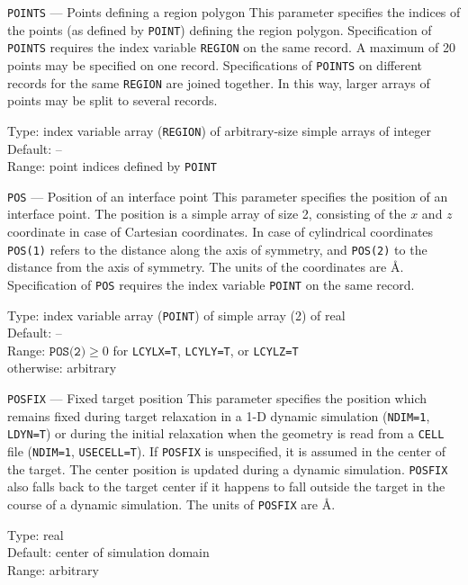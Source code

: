 \begin{keydescription}{\texttt{POINTS} --- Points defining a region polygon}
%
  This parameter specifies the indices of the points (as defined by
  \texttt{POINT}) defining the region polygon.  Specification of
  \texttt{POINTS} requires the index variable \texttt{REGION} on the same
  record. A maximum of 20 points may be specified on one record.
  Specifications of \texttt{POINTS} on different records for the same
  \texttt{REGION} are joined together.  In this way, larger arrays of points 
  may be split to several records.  
  \begin{keytab}
    Type:    \> index variable array (\texttt{REGION}) of arbitrary-size 
    simple arrays of integer \\
    Default: \> -- \\
    Range:   \> point indices defined by \texttt{POINT} 
  \end{keytab}
\end{keydescription}

\begin{keydescription}{\texttt{POS} --- Position of an interface point}
%
  This parameter specifies the position of an interface point. The
  position is a simple array of size 2, consisting of the $x$ and $z$
  coordinate in case of Cartesian coordinates. In case of cylindrical
  coordinates \texttt{POS(1)} refers to the distance along the axis of
  symmetry, and \texttt{POS(2)} to the distance from the axis of symmetry.
  The units of the coordinates are \AA.  Specification of \texttt{POS} 
  requires the index variable \texttt{POINT} on the same record. 
  \begin{keytab}
    Type:    \> index variable array (\texttt{POINT}) of simple array
                (2) of real \\
    Default: \> -- \\
   Range:    \> $\texttt{POS(2)} \ge 0$ for \texttt{LCYLX=T}, \texttt{LCYLY=T}, or
                \texttt{LCYLZ=T} \\ 
             \> otherwise: arbitrary
\end{keytab}
\end{keydescription}

\begin{keydescription}{\texttt{POSFIX} --- Fixed target position}
%
  This parameter specifies the position which remains fixed during
  target relaxation in a 1-D dynamic simulation (\texttt{NDIM=1},
  \texttt{LDYN=T}) or during the initial relaxation when the geometry is read 
  from a \texttt{CELL} file (\texttt{NDIM=1}, \texttt{USECELL=T}).  If 
  \texttt{POSFIX} is unspecified, it is assumed in the center of the target.
  The center position is updated during a dynamic simulation. \texttt{POSFIX}
  also falls back to the target center if it happens to fall outside the target
  in the course of a dynamic simulation.  The units of \texttt{POSFIX} are \AA.
  \begin{keytab}
    Type:    \> real \\
   Default:  \> center of simulation domain \\
   Range:    \> arbitrary
\end{keytab}
\end{keydescription}

